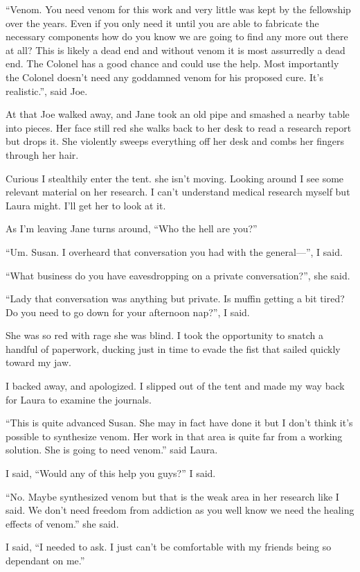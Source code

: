 ``Venom. You need venom for this work and very little was kept by the fellowship over the years. Even if you only need it until you are able to fabricate the necessary components how do you know we are going to find any more out there at all? This is likely a dead end and without venom it is most assurredly a dead end. The Colonel has a good chance and could use the help. Most importantly the Colonel doesn't need any goddamned venom for his proposed cure. It's realistic.'', said Joe.

At that Joe walked away, and Jane took an old pipe and smashed a nearby table into pieces. Her face still red she walks back to her desk to read a research report but drops it. She violently sweeps everything off her desk and combs her fingers through her hair.

Curious I stealthily enter the tent. she isn't moving. Looking around I see some relevant material on her research. I can't understand medical research myself but Laura might. I'll get her to look at it.

As I'm leaving Jane turns around, ``Who the hell are you?''

``Um. Susan. I overheard that conversation you had with the general---'', I said.

``What business do you have eavesdropping on a private conversation?'', she said.

``Lady that conversation was anything but private. Is muffin getting a bit tired? Do you need to go down for your afternoon nap?'', I said.

She was so red with rage she was blind. I took the opportunity to snatch a handful of paperwork, ducking just in time to evade the fist that sailed quickly toward my jaw.

I backed away, and apologized. I slipped out of the tent and made my way back for Laura to examine the journals.

``This is quite advanced Susan. She may in fact have done it but I don't think it's possible to synthesize venom. Her work in that area is quite far from a working solution. She is going to need venom.'' said Laura.

I said, ``Would any of this help you guys?'' I said.

``No. Maybe synthesized venom but that is the weak area in her research like I said. We don't need freedom from addiction as you well know we need the healing effects of venom.'' she said.

I said, ``I needed to ask. I just can't be comfortable with my friends being so dependant on me.''


